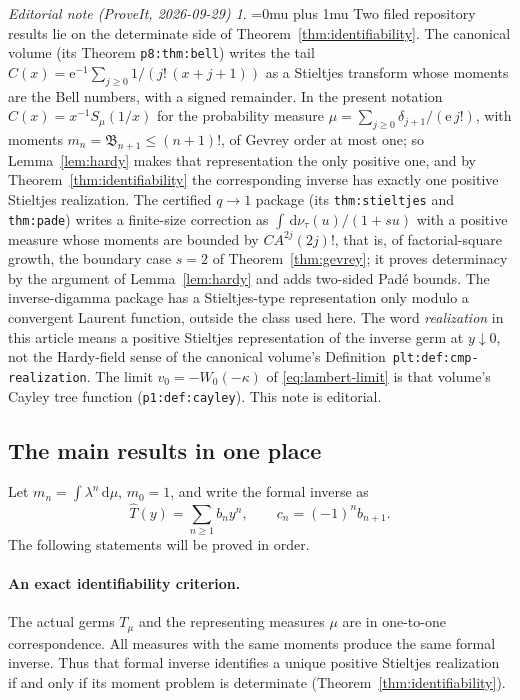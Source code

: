 \documentclass[11pt,a4paper]{article}
\numberwithin{equation}{section}
\theoremstyle{definition}
\theoremstyle{remark}
\newtheorem*{ednoteinner}{Editorial note (ProveIt, 2026-09-29)}
\newenvironment{ednote}{\begin{ednoteinner}\sloppy\Urlmuskip=0mu plus 1mu\relax}{\end{ednoteinner}}
\newcommand{\dd}{\,\mathrm d}
\newcommand{\ee}{\mathrm e}
\begin{document}
\begin{ednote}
Two filed repository results lie on the determinate side of
Theorem~\ref{thm:identifiability}. The canonical volume \cite{ed:tai}
(its Theorem \texttt{p8:thm:bell}) writes the tail
\(C(x)=\ee^{-1}\sum_{j\ge0}1/(j!\,(x+j+1))\) as a Stieltjes transform
whose moments are the Bell numbers, with a signed remainder. In the
present notation \(C(x)=x^{-1}S_\mu(1/x)\) for the probability measure
\(\mu=\sum_{j\ge0}\delta_{j+1}/(\ee\,j!)\), with moments
\(m_n=\mathfrak B_{n+1}\le(n+1)!\), of Gevrey order at most one; so
Lemma~\ref{lem:hardy} makes that representation the only positive one,
and by Theorem~\ref{thm:identifiability} the corresponding inverse has
exactly one positive Stieltjes realization. The certified \(q\to1\)
package \cite{ed:ciq} (its \texttt{thm:stieltjes} and \texttt{thm:pade})
writes a finite-size correction as \(\int\dd\nu_\tau(u)/(1+su)\) with a
positive measure whose moments are bounded by \(CA^{2j}(2j)!\), that is,
of factorial-square growth, the boundary case \(s=2\) of
Theorem~\ref{thm:gevrey}; it proves determinacy by the argument of
Lemma~\ref{lem:hardy} and adds two-sided Pad\'e bounds. The
inverse-digamma package \cite{ed:ids} has a Stieltjes-type representation
only modulo a convergent Laurent function, outside the class used here.
The word \emph{realization} in this article means a positive Stieltjes
representation of the inverse germ at \(y\downarrow0\), not the
Hardy-field sense of the canonical volume's
Definition~\texttt{plt:def:cmp-realization}. The limit
\(v_0=-W_0(-\kappa)\) of \eqref{eq:lambert-limit} is that volume's Cayley
tree function (\texttt{p1:def:cayley}). This note is editorial.
\end{ednote}

\subsection{The main results in one place}
Let \(m_n=\int\lambda^n\dd\mu\), \(m_0=1\), and write the formal inverse as
\begin{equation}
 \widehat T(y)=\sum_{n\ge1}b_ny^n,
 \qquad c_n=(-1)^n b_{n+1}.
\end{equation}
The following statements will be proved in order.

\paragraph{An exact identifiability criterion.}
The actual germs \(T_\mu\) and the representing measures \(\mu\) are in
one-to-one correspondence. All measures with the same moments produce
the same formal inverse. Thus that formal inverse identifies a unique
positive Stieltjes realization if and only if its moment problem is
determinate (Theorem~\ref{thm:identifiability}).
\end{document}
